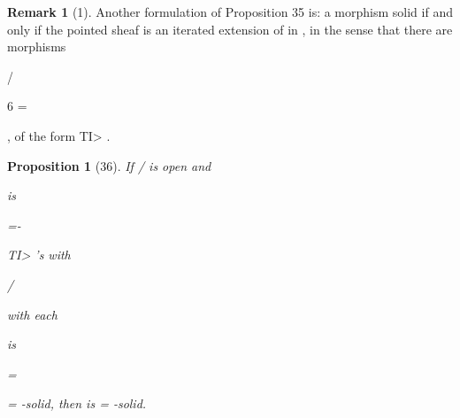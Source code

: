 \documentclass[11pt,a4paper]{article}
\theoremstyle{plain}
\newtheorem{proposition}[theorem]{Proposition}
\theoremstyle{definition}
\newtheorem{remark}[theorem]{Remark}
\begin{document}
\begin{remark}[1]
Another formulation of Proposition 35 is: a morphism
solid if and only if the pointed sheaf
is an iterated extension of
in , in the sense that there are morphisms



/

6 =

, 
  of the form TI> .
\end{remark}

\begin{proposition}[36]
If  /
is open and



is

=-

TI> 's with

/

with each

is

=

= -solid, then  is = -solid.

\end{proposition}
\end{document}
